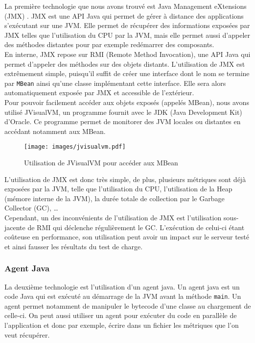 La première technologie que nous avons trouvé est Java Management eXtensions (JMX) \cite{jmx}. JMX est une API Java qui permet de gérer à distance des applications s'exécutant sur une JVM. Elle permet de récupérer des informations exposées par JMX telles que l'utilisation du CPU par la JVM, mais elle permet aussi d'appeler des méthodes distantes pour par exemple redémarrer des composants.\\

En interne, JMX repose sur RMI (Remote Method Invocation), une API Java qui permet d'appeler des méthodes sur des objets distants. L'utilisation de JMX est extrêmement simple, puisqu'il suffit de créer une interface dont le nom se termine par \verb+MBean+ ainsi qu'une classe implémentant cette interface. Elle sera alors automatiquement exposée par JMX et accessible de l'extérieur.\\

Pour pouvoir facilement accéder aux objets exposés (appelés MBean), nous avons utilisé JVisualVM, un programme fournit avec le JDK (Java Development Kit) d'Oracle. Ce programme permet de monitorer des JVM locales ou distantes en accédant notamment aux MBean.

\begin{figure}[H]
 \centering
 \texttt{[image: images/jvisualvm.pdf]}
 \caption{Utilisation de JVisualVM pour accéder aux MBean}
\end{figure}


L'utilisation de JMX est donc très simple, de plus, plusieurs métriques sont déjà exposées par la JVM, telle que l'utilisation du CPU, l'utilisation de la Heap (mémore interne de la JVM), la durée totale de collection par le Garbage Collector (GC), \dots{}\\

Cependant, un des inconvénients de l'utilisation de JMX est l'utilisation sous-jacente de RMI qui déclenche régulièrement le GC. L'exécution de celui-ci étant coûteuse en performance, son utilisation peut avoir un impact sur le serveur testé et ainsi fausser les résultats du test de charge.

\subsubsection{Agent Java}

La deuxième technologie est l'utilisation d'un agent java. Un agent java est un code Java qui est exécuté au démarrage de la JVM avant la méthode \verb+main+. Un agent permet notamment de manipuler le bytecode d'une classe au chargement de celle-ci. On peut aussi utiliser un agent pour exécuter du code en parallèle de l'application et donc par exemple, écrire dans un fichier les métriques que l'on veut récupérer.\\

